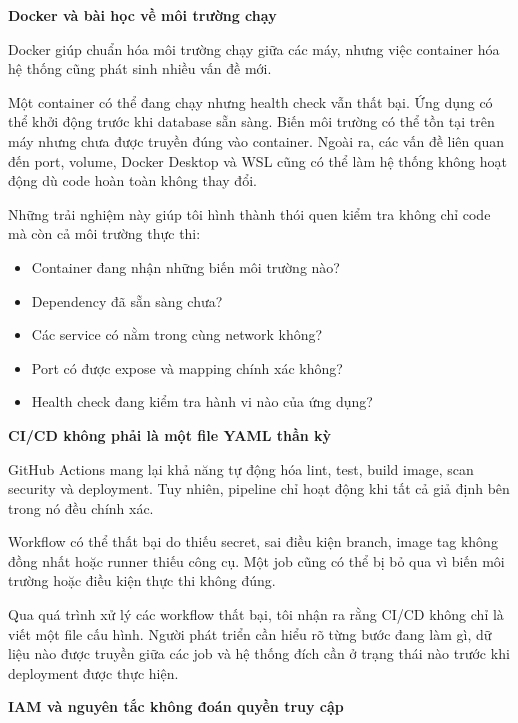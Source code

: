 \vspace{0.5em}\noindent\textbf{Docker và bài học về môi trường
chạy}\par

Docker giúp chuẩn hóa môi trường chạy giữa các máy, nhưng việc container
hóa hệ thống cũng phát sinh nhiều vấn đề mới.

Một container có thể đang chạy nhưng health check vẫn thất bại. Ứng dụng
có thể khởi động trước khi database sẵn sàng. Biến môi trường có thể tồn
tại trên máy nhưng chưa được truyền đúng vào container. Ngoài ra, các
vấn đề liên quan đến port, volume, Docker Desktop và WSL cũng có thể làm
hệ thống không hoạt động dù code hoàn toàn không thay đổi.

Những trải nghiệm này giúp tôi hình thành thói quen kiểm tra không chỉ
code mà còn cả môi trường thực thi:

\begin{itemize}
\tightlist
\item
  Container đang nhận những biến môi trường nào?
\item
  Dependency đã sẵn sàng chưa?
\item
  Các service có nằm trong cùng network không?
\item
  Port có được expose và mapping chính xác không?
\item
  Health check đang kiểm tra hành vi nào của ứng dụng?
\end{itemize}

\vspace{0.5em}\noindent\textbf{CI/CD không phải là một file YAML thần
kỳ}\par

GitHub Actions mang lại khả năng tự động hóa lint, test, build image,
scan security và deployment. Tuy nhiên, pipeline chỉ hoạt động khi tất
cả giả định bên trong nó đều chính xác.

Workflow có thể thất bại do thiếu secret, sai điều kiện branch, image
tag không đồng nhất hoặc runner thiếu công cụ. Một job cũng có thể bị bỏ
qua vì biến môi trường hoặc điều kiện thực thi không đúng.

Qua quá trình xử lý các workflow thất bại, tôi nhận ra rằng CI/CD không
chỉ là viết một file cấu hình. Người phát triển cần hiểu rõ từng bước
đang làm gì, dữ liệu nào được truyền giữa các job và hệ thống đích cần ở
trạng thái nào trước khi deployment được thực hiện.

\vspace{0.5em}\noindent\textbf{IAM và nguyên tắc không đoán quyền truy
cập}\par

